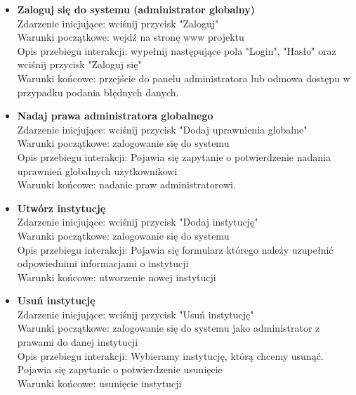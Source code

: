 \documentclass{article}
\begin{document}
\begin{itemize}
	\item \textbf{Zaloguj się do systemu (administrator globalny)}	
	\\Zdarzenie inicjujące: wciśnij przycisk "Zaloguj"	
	\\Warunki początkowe: wejdź na stronę www projektu	
	\\Opis przebiegu interakcji: wypełnij następujące pola "Login", "Hasło" oraz wciśnij przycisk "Zaloguj się"	
	\\Warunki końcowe: przejście do panelu administratora lub odmowa dostępu w przypadku podania błędnych danych.
	
	
	\item \textbf{Nadaj prawa administratora globalnego}	
	\\Zdarzenie inicjujące: wciśnij przycisk "Dodaj uprawnienia globalne"	
	\\Warunki początkowe: zalogowanie się do systemu	
	\\Opis przebiegu interakcji: Pojawia się zapytanie o potwierdzenie nadania uprawnień globalnych użytkownikowi	
	\\Warunki końcowe: nadanie praw administratorowi.
	
	
	\item \textbf{Utwórz instytucję}
	\\Zdarzenie inicjujące: wciśnij przycisk "Dodaj instytucję"
	\\Warunki początkowe: zalogowanie się do systemu
	\\Opis przebiegu interakcji: Pojawia się formularz którego należy uzupełnić odpowiednimi informacjami o instytucji
	\\Warunki końcowe: utworzenie nowej instytucji
	
	
	\item \textbf{Usuń instytucję}
	\\Zdarzenie inicjujące: wciśnij przycisk "Usuń instytucję"
	\\Warunki początkowe: zalogowanie się do systemu jako administrator z prawami do danej instytucji	
	\\Opis przebiegu interakcji: Wybieramy instytucję, którą chcemy usunąć. Pojawia się zapytanie o potwierdzenie usunięcie
	\\Warunki końcowe: usunięcie instytucji
	
	
\end{itemize}
\end{document}

